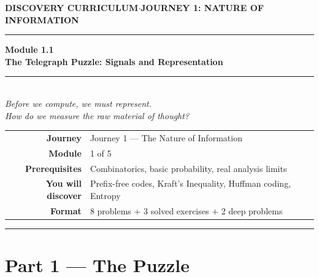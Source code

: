 

\thispagestyle{empty}
\begin{center}
{\small\color{CompBlue}\textbf{DISCOVERY CURRICULUM}\quad$\cdot$\quad\textbf{JOURNEY 1: NATURE OF INFORMATION}}

\vspace{0.6cm}
{\color{CompNavy}\rule{\linewidth}{2pt}}
\vspace{0.5cm}

{\Huge\bfseries\color{CompNavy}Module 1.1}\\[0.3cm]
{\LARGE\bfseries\color{CompBlue}The Telegraph Puzzle: Signals and Representation}\\[0.4cm]
{\color{CompGold}\rule{0.4\linewidth}{1.2pt}}\\[0.4cm]
{\large\itshape\color{DarkGrey}
Before we compute, we must represent.\\
How do we measure the raw material of thought?}

\vspace{1cm}
\begin{tabular}{rl}
\color{DarkGrey}\textbf{Journey}           & Journey 1 --- The Nature of Information \\[4pt]
\color{DarkGrey}\textbf{Module}            & 1 of 5 \\[4pt]
\color{DarkGrey}\textbf{Prerequisites}     & Combinatorics, basic probability, real analysis limits \\[4pt]
\color{DarkGrey}\textbf{You will discover} & Prefix-free codes, Kraft's Inequality, Huffman coding, Entropy \\[4pt]
\color{DarkGrey}\textbf{Format}            & 8 problems $+$ 3 solved exercises $+$ 2 deep problems \\
\end{tabular}

\vspace{1.5cm}
{\color{CompNavy}\rule{\linewidth}{2pt}}
\end{center}

\newpage


\section{Part 1 \texorpdfstring{---}{--} The Puzzle}

